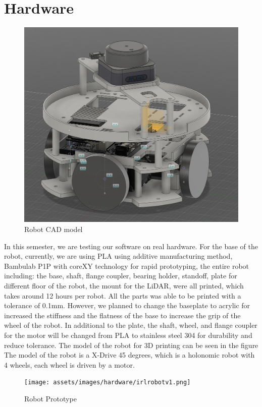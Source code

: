 \chapter{Hardware}

 
\begin{figure} [H]
    \centering
    \includegraphics[width=0.65\linewidth]{assets/images/hardware/robotcad3layer.png}
    \caption{Robot CAD model}
    \label{fig:robo-cad}
\end{figure}

In this semester, we are testing our software on real hardware.  For the base of the robot, currently, we are using PLA using additive manufacturing method, Bambulab P1P with coreXY technology for rapid prototyping, the entire robot including: the base, shaft, flange coupler, bearing holder, standoff, plate for different floor of the robot, the mount for the LiDAR, were all printed, which takes around 12 hours per robot. All the parts was able to be printed with a tolerance of 0.1mm. However, we planned to change the baseplate to acrylic for increased the stiffness and the flatness of the base to increase the grip of the wheel of the robot. In additional to the plate, the shaft, wheel, and flange coupler for the motor will be changed from PLA to stainless steel 304 for durability and reduce tolerance.
The model of the robot for 3D printing can be seen in the figure 
The model of the robot is a X-Drive 45 degrees, which is a holonomic robot with 4 wheels, each wheel is driven by a motor.

\begin{figure} [H]
    \centering
    \texttt{[image: assets/images/hardware/irlrobotv1.png]}
    \caption{Robot Prototype}
    \label{fig:robo-irl}
\end{figure}

